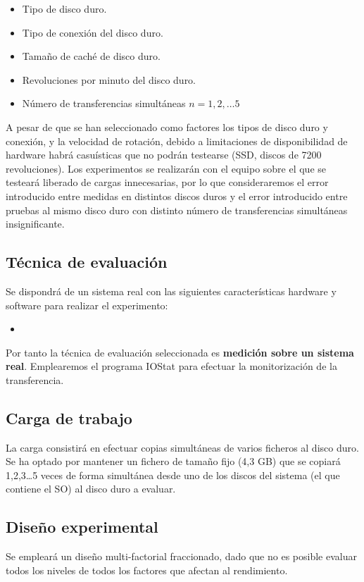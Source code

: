 \documentclass[a4paper,10pt]{article}
\begin{document}
\begin{itemize}
 \item Tipo de disco duro.
 \item Tipo de conexión del disco duro.
 \item Tamaño de caché de disco duro.
 \item Revoluciones por minuto del disco duro.
 \item Número de transferencias simultáneas $n=1,2,\ldots5$
\end{itemize}

 A pesar de que se han seleccionado como factores los tipos de disco duro y conexión, y la velocidad de rotación, debido a 
 limitaciones de disponibilidad de hardware habrá casuísticas que no podrán testearse (SSD, discos de 7200 revoluciones). Los
 experimentos se realizarán con el equipo sobre el que se testeará liberado de cargas innecesarias, por lo que consideraremos
 el error introducido entre medidas en distintos discos duros y el error introducido entre pruebas al mismo disco duro con distinto
 número de transferencias simultáneas insignificante.
 
 \subsection{Técnica de evaluación}
 Se dispondrá de un sistema real con las siguientes características hardware y software para realizar el experimento:
 \begin{itemize}
  \item 
 \end{itemize}
 Por tanto la técnica de evaluación seleccionada es \textbf{medición sobre un sistema real}. Emplearemos el programa
 IOStat para efectuar la monitorización de la transferencia.

 \subsection{Carga de trabajo}
 La carga consistirá en efectuar copias simultáneas de varios ficheros al disco duro. Se ha optado por mantener
 un fichero de tamaño fijo (4,3 GB) que se copiará 1,2,3\ldots 5 veces de forma simultánea desde uno de los discos
 del sistema (el que contiene el SO) al disco duro a evaluar.%
 
 \subsection{Diseño experimental}
 Se empleará un diseño multi-factorial fraccionado, dado que no es posible evaluar todos los niveles de todos los factores
 que afectan al rendimiento.
 
\end{document}
